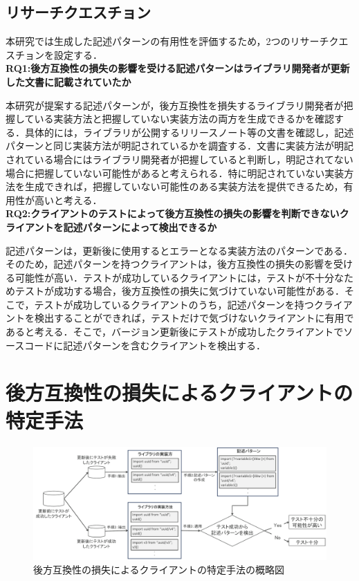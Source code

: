 \documentclass[11pt]{jreport}
\newcommand{\RQOne}{後方互換性の損失の影響を受ける記述パターンはライブラリ開発者が更新した文書に記載されていたか}
\newcommand{\RQTwo}{クライアントのテストによって後方互換性の損失の影響を判断できないクライアントを記述パターンによって検出できるか}
\begin{document}
\section{リサーチクエスチョン}    
本研究では生成した記述パターンの有用性を評価するため，2つのリサーチクエスチョンを設定する．
\\
\noindent\textbf{RQ1:\RQOne}

本研究が提案する記述パターンが，後方互換性を損失するライブラリ開発者が把握している実装方法と把握していない実装方法の両方を生成できるかを確認する．具体的には，ライブラリが公開するリリースノート等の文書を確認し，記述パターンと同じ実装方法が明記されているかを調査する．文書に実装方法が明記されている場合にはライブラリ開発者が把握していると判断し，明記されてない場合に把握していない可能性があると考えられる．特に明記されていない実装方法を生成できれば，把握していない可能性のある実装方法を提供できるため，有用性が高いと考える．
\\
\noindent\textbf{RQ2:\RQTwo}

記述パターンは，更新後に使用するとエラーとなる実装方法のパターンである．そのため，記述パターンを持つクライアントは，後方互換性の損失の影響を受ける可能性が高い．テストが成功しているクライアントには，テストが不十分なためテストが成功する場合，後方互換性の損失に気づけていない可能性がある．そこで，テストが成功しているクライアントのうち，記述パターンを持つクライアントを検出することができれば，テストだけで気づけないクライアントに有用であると考える．そこで，バージョン更新後にテストが成功したクライアントでソースコードに記述パターンを含むクライアントを検出する．

\chapter{後方互換性の損失によるクライアントの特定手法}\label{sec:method}
\begin{figure}[ht]
\centerline{\includegraphics[width=1.0\linewidth]{BSthesis2024_Iida_fig/method.pdf}}
\caption{後方互換性の損失によるクライアントの特定手法の概略図}
\label{fig:method-overview}
\end{figure}
\end{document}
